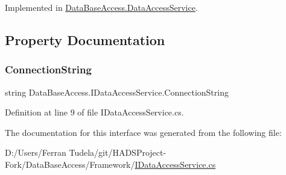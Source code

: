 Implemented in \mbox{\hyperlink{classDataBaseAccess_1_1DataAccessService_a422e6ead446da4cfcdc33255193ac92e}{Data\+Base\+Access.\+Data\+Access\+Service}}.



\subsection{Property Documentation}
\mbox{\label{interfaceDataBaseAccess_1_1IDataAccessService_aced282143a1c60f5cc534af50cf10b32}} 
\subsubsection{\texorpdfstring{ConnectionString}{ConnectionString}}
{\footnotesize\ttfamily string Data\+Base\+Access.\+I\+Data\+Access\+Service.\+Connection\+String\hspace{0.3cm}{\ttfamily [get]}}



Definition at line 9 of file I\+Data\+Access\+Service.\+cs.



The documentation for this interface was generated from the following file\+:\begin{DoxyCompactItemize}
\item 
D\+:/\+Users/\+Ferran Tudela/git/\+H\+A\+D\+S\+Project-\/\+Fork/\+Data\+Base\+Access/\+Framework/\mbox{\hyperlink{IDataAccessService_8cs}{I\+Data\+Access\+Service.\+cs}}\end{DoxyCompactItemize}
